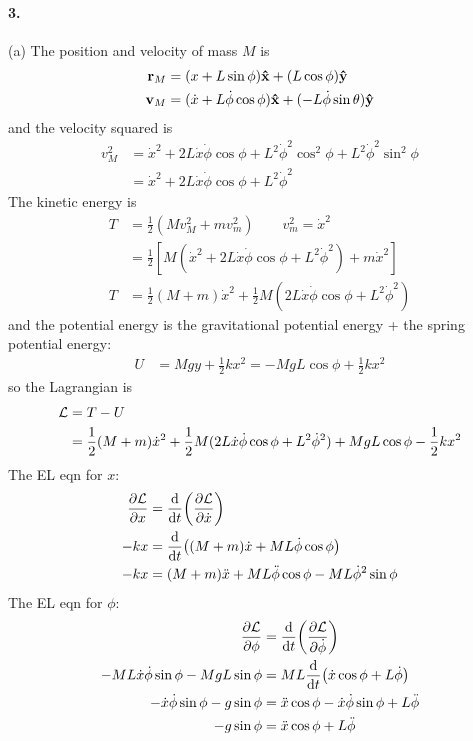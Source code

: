 \documentclass[../hw.tex]{subfiles}
\begin{document}
\paragraph*{3.} (a) The position and velocity of mass $M$ is
\begin{align*}
    \vb r_M &= (x + L \sin\phi) \vu x + (L\cos\phi) \vu y \\
    \vb v_M &= (\dot x + L\dot \phi \cos\phi) \vu x + (-L\dot \phi \sin\theta) \vu y \\ 
\end{align*}
and the velocity squared is
\begin{align*}
    v_M^2 &= \dot x^2 + 2L\dot x \dot \phi \cos\phi + L^2 \dot \phi^2 \cos^2\phi
        + L^2 \dot \phi^2 \sin^2\phi \\
    &= \dot x^2 + 2L\dot x \dot \phi \cos\phi + L^2 \dot \phi^2
\end{align*}
The kinetic energy is
\begin{align*}
    T &= \frac{1}{2} (Mv_M^2 + mv_m^2) \qquad v_m^2 = \dot x^2 \\
    &= \frac{1}{2} [M(\dot x^2 + 2L\dot x \dot \phi \cos\phi + L^2 \dot \phi^2) + m\dot x^2] \\
    T &= \frac{1}{2} (M + m) \dot x^2 + \frac{1}{2}M(2L\dot x \dot\phi \cos\phi + L^2 \dot\phi^2)
\end{align*}
and the potential energy is the gravitational potential energy + the spring potential energy:
\begin{align*}
    U &= Mgy + \frac{1}{2}kx^2 = -MgL\cos\phi + \frac{1}{2}kx^2
\end{align*}
so the Lagrangian is
\begin{align*}
    \mathcal{L} &= T - U \\
    &= \frac{1}{2} (M + m) \dot x^2 + \frac{1}{2}M(2L\dot x \dot\phi \cos\phi + L^2 \dot\phi^2)
        + MgL\cos\phi - \frac{1}{2}kx^2
\end{align*}
The EL eqn for $x$:
\begin{align*}
    \pdv{\mathcal{L}}{x} &= \dv{t}(\pdv{\mathcal{L}}{\dot x})\\
    - kx &= \dv{t}((M + m)\dot x + ML\dot \phi \cos\phi) \\
    -kx &= (M + m) \ddot x + ML \ddot \phi \cos\phi - ML\dot\phi^2 \sin\phi
\end{align*}
The EL eqn for $\phi$:
\begin{align*}
    \pdv{\mathcal{L}}{\phi} &= \dv{t}(\pdv{\mathcal{L}}{\dot \phi}) \\
    -ML\dot x \dot\phi \sin\phi - MgL\sin\phi &= ML \dv{t}(\dot x \cos\phi + L \dot \phi) \\
    -\dot x \dot\phi \sin\phi - g \sin\phi &= \ddot x \cos\phi - \dot x \dot\phi \sin\phi + L\ddot \phi \\
    -g\sin\phi &= \ddot x \cos\phi + L\ddot \phi
\end{align*}
\end{document}
